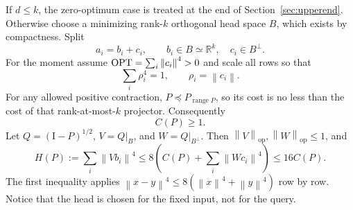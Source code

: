 \documentclass[11pt]{article}
\theoremstyle{remark}\newtheorem{remark}[theorem]{Remark}
\newcommand{\R}{\mathbb R}\newcommand{\E}{\mathbb E}\newcommand{\Prob}{\mathbb P}
\newcommand{\op}{\mathrm{op}}\newcommand{\Frob}{\mathrm F}
\newcommand{\norm}[1]{\left\lVert#1\right\rVert}\newcommand{\abs}[1]{\left|#1\right|}
\newcommand{\Id}{\mathrm I}\newcommand{\dbar}{\bar d}
\numberwithin{equation}{section}
\begin{document}
If $d\le k$, the zero-optimum case is treated at the end of Section~\ref{sec:upperend}. Otherwise choose a minimizing rank-$k$ orthogonal head space $B$, which exists by compactness. Split
\[
 a_i=b_i+c_i,\qquad b_i\in B\simeq\R^k,\quad c_i\in B^\perp.
\]
For the moment assume $\OPT=\sum_i\norm{c_i}^4>0$ and scale all rows so that
\begin{equation}\label{eq:optnorm}
 \sum_i\rho_i^4=1,\qquad \rho_i=\norm{c_i}.
\end{equation}
For any allowed positive contraction, $P\preceq P_{\operatorname{range}P}$, so its cost is no less than the cost of that rank-at-most-$k$ projector. Consequently
\begin{equation}\label{eq:Cge1}
 C(P)\ge1.
\end{equation}
Let $Q=(\Id-P)^{1/2}$, $V=Q|_B$, and $W=Q|_{B^\perp}$. Then $\norm V_\op,\norm W_\op\le1$, and
\begin{equation}\label{eq:H}
 H(P):=\sum_i\norm{Vb_i}^4
 \le8\left(C(P)+\sum_i\norm{Wc_i}^4\right)\le16C(P).
\end{equation}
The first inequality applies $\norm{x-y}^4\le8(\norm x^4+\norm y^4)$ row by row. Notice that the head is chosen for the fixed input, not for the query.
\end{document}
